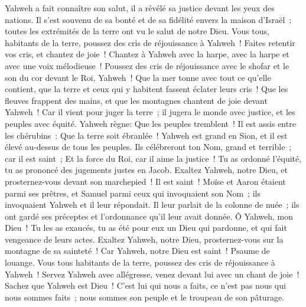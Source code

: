 \begin{multicols}{2}
Yahweh a fait connaître son salut, il a révélé sa justice devant les yeux des nations.
Il s'est souvenu de sa bonté et de sa fidélité envers la maison d'Israël~; toutes les extrémités de la terre ont vu le salut de notre Dieu.
Vous tous, habitants de la terre, poussez des cris de réjouissance à Yahweh~! Faites retentir vos cris, et chantez de joie~!
Chantez à Yahweh avec la harpe, avec la harpe et avec une voix mélodieuse~!
Poussez des cris de réjouissance avec le shofar et le son du cor devant le Roi, Yahweh~!
Que la mer tonne avec tout ce qu'elle contient, que la terre et ceux qui y habitent fassent éclater leurs cris~!
Que les fleuves frappent des mains, et que les montagnes chantent de joie
devant Yahweh~! Car il vient pour juger la terre~; il jugera le monde avec justice, et les peuples avec équité.
\VerseOne{}Yahweh règne: Que les peuples tremblent~! Il est assis entre les chérubins~: Que la terre soit ébranlée~!
Yahweh est grand en Sion, et il est élevé au-dessus de tous les peuples.
Ils célébreront ton Nom, grand et terrible~; car il est saint~;
Et la force du Roi, car il aime la justice~! Tu as ordonné l'équité, tu as prononcé des jugements justes en Jacob.
Exaltez Yahweh, notre Dieu, et prosternez-vous devant son marchepied~! Il est saint~!
Moïse et Aaron étaient parmi ses prêtres, et Samuel parmi ceux qui invoquaient son Nom~; ils invoquaient Yahweh et il leur répondait.
Il leur parlait de la colonne de nuée~; ils ont gardé ses préceptes et l'ordonnance qu'il leur avait donnée.
Ô Yahweh, mon Dieu~! Tu les as exaucés, tu as été pour eux un Dieu qui pardonne, et qui fait vengeance de leurs actes.
Exaltez Yahweh, notre Dieu, prosternez-vous sur la montagne de sa sainteté~! Car Yahweh, notre Dieu est saint~!
\VerseOne{}Psaume de louange. Vous tous habitants de la terre, poussez des cris de réjouissance à Yahweh~!
Servez Yahweh avec allégresse, venez devant lui avec un chant de joie~!
Sachez que Yahweh est Dieu~! C'est lui qui nous a faits, ce n'est pas nous qui nous sommes faits~; nous sommes son peuple et le troupeau de son pâturage.

\end{multicols}
